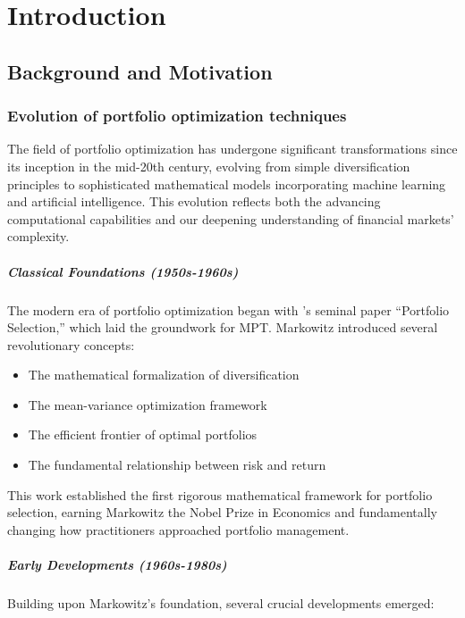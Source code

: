 
\chapter{Introduction}\label{chapter:introduction}

\section{Background and Motivation}


\subsection{Evolution of portfolio optimization techniques}
The field of portfolio optimization has undergone significant transformations since its inception in the mid-20th century, evolving from simple diversification principles to sophisticated mathematical models incorporating machine learning and artificial intelligence. 
This evolution reflects both the advancing computational capabilities and our deepening understanding of financial markets' complexity.


\paragraph{Classical Foundations (1950s-1960s)}
The modern era of portfolio optimization began with \parencite{markowitz1952portfolio}'s seminal paper ``Portfolio Selection,'' which laid the groundwork for \ac{MPT}. Markowitz introduced several revolutionary concepts:

\begin{itemize}
    \item The mathematical formalization of diversification
    \item The mean-variance optimization framework
    \item The efficient frontier of optimal portfolios
    \item The fundamental relationship between risk and return
\end{itemize}

This work established the first rigorous mathematical framework for portfolio selection, earning Markowitz the Nobel Prize in Economics and fundamentally changing how practitioners approached portfolio management.

\paragraph{Early Developments (1960s-1980s)}
Building upon Markowitz's foundation, several crucial developments emerged:

